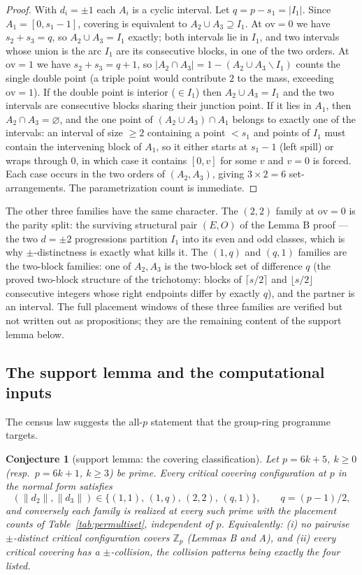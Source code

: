 \documentclass[11pt,a4paper]{article}
\numberwithin{equation}{section}
\theoremstyle{plain}
\theoremstyle{plain}
\newtheorem{conjecture}[theorem]{Conjecture}
\theoremstyle{definition}
\theoremstyle{remark}
\newcommand{\Z}{\mathbb{Z}}
\begin{document}
\begin{proof}
With $d_i=\pm1$ each $A_i$ is a cyclic interval. Let $q=p-s_1=|I_1|$. Since
$A_1=[0,s_1-1]$, covering is equivalent to $A_2\cup A_3\supseteq I_1$.
At $\mathrm{ov}=0$ we have $s_2+s_3=q$, so $A_2\cup A_3=I_1$ exactly; both
intervals lie in $I_1$, and two intervals whose union is the arc $I_1$ are
its consecutive blocks, in one of the two orders. At $\mathrm{ov}=1$ we have
$s_2+s_3=q+1$, so $|A_2\cap A_3|=1-(A_2\cup A_3\smallsetminus I_1)$ counts
the single double point (a triple point would contribute $2$ to the mass,
exceeding $\mathrm{ov}=1$). If the double point is interior
($\in I_1$) then $A_2\cup A_3=I_1$ and the two intervals are consecutive
blocks sharing their junction point. If it lies in $A_1$, then
$A_2\cap A_3=\varnothing$, and the one point of $(A_2\cup A_3)\cap A_1$
belongs to exactly one of the intervals: an interval of size $\ge2$
containing a point $<s_1$ and points of $I_1$ must contain the intervening
block of $A_1$, so it either starts at $s_1-1$ (left spill) or wraps through
$0$, in which case it contains $[0,v]$ for some $v$ and $v=0$ is forced.
Each case occurs in the two orders of $(A_2,A_3)$, giving $3\times2=6$
set-arrangements. The parametrization count is immediate.
\end{proof}

The other three families have the same character. The $(2,2)$ family at
$\mathrm{ov}=0$ is the parity split: the surviving structural pair
$(E,O)$ of the Lemma B proof --- the two $d=\pm2$ progressions partition
$I_1$ into its even and odd classes, which is why $\pm$-distinctness is
exactly what kills it. The $(1,q)$ and $(q,1)$ families are the two-block
families: one of $A_2,A_3$ is the two-block set of difference $q$
(the proved two-block structure of the trichotomy: blocks of
$\lceil s/2\rceil$ and $\lfloor s/2\rfloor$ consecutive integers whose right
endpoints differ by exactly $q$), and the partner is an interval. The full
placement windows of these three families are verified but not written out
as propositions; they are the remaining content of the support lemma below.

\subsection{The support lemma and the computational inputs}
\label{sec:gt-support}

The census law suggests the all-$p$ statement that the group-ring programme
targets.

\begin{conjecture}[support lemma: the covering classification]\label{conj:SL}
Let $p=6k+5$, $k\ge0$ (resp.\ $p=6k+1$, $k\ge3$) be prime. Every critical
covering configuration at $p$ in the normal form satisfies
\[
(\|d_2\|,\|d_3\|)\in\{(1,1),\,(1,q),\,(2,2),\,(q,1)\},
\qquad q=(p-1)/2,
\]
and conversely each family is realized at every such prime with the
placement counts of Table~\ref{tab:permultiset}, independent of $p$.
Equivalently: \textup{(i)} no pairwise $\pm$-distinct critical
configuration covers $\Z_p$ (Lemmas B and A), and \textup{(ii)} every
critical covering has a $\pm$-collision, the collision patterns being
exactly the four listed.
\end{conjecture}
\end{document}
